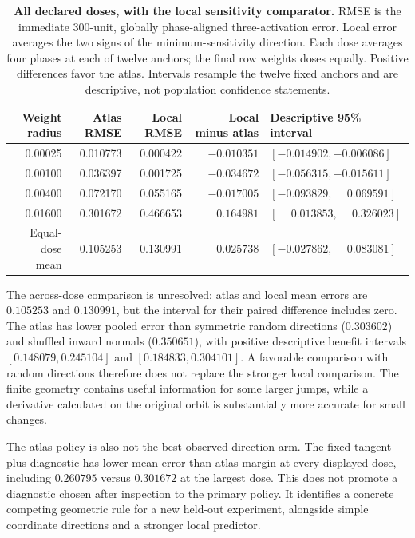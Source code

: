 \begin{table}[H]
\centering\small
\setlength{\tabcolsep}{4pt}
\begin{tabular}{rrrrl}
\toprule
Weight radius & Atlas RMSE & Local RMSE & Local minus atlas & Descriptive 95\% interval\\
\midrule
0.00025 & 0.010773 & 0.000422 & $-0.010351$ & $[-0.014902,-0.006086]$\\
0.00100 & 0.036397 & 0.001725 & $-0.034672$ & $[-0.056315,-0.015611]$\\
0.00400 & 0.072170 & 0.055165 & $-0.017005$ & $[-0.093829,\phantom{-}0.069591]$\\
0.01600 & 0.301672 & 0.466653 & $\phantom{-}0.164981$ & $[\phantom{-}0.013853,\phantom{-}0.326023]$\\
\midrule
Equal-dose mean & 0.105253 & 0.130991 & $\phantom{-}0.025738$ & $[-0.027862,\phantom{-}0.083081]$\\
\bottomrule
\end{tabular}
\caption{\textbf{All declared doses, with the local sensitivity comparator.} RMSE is the immediate 300-unit, globally phase-aligned three-activation error. Local error averages the two signs of the minimum-sensitivity direction. Each dose averages four phases at each of twelve anchors; the final row weights doses equally. Positive differences favor the atlas. Intervals resample the twelve fixed anchors and are descriptive, not population confidence statements.}
\label{tab:utility}
\end{table}

The across-dose comparison is unresolved: atlas and local mean errors are $0.105253$ and $0.130991$, but the interval for their paired difference includes zero. The atlas has lower pooled error than symmetric random directions ($0.303602$) and shuffled inward normals ($0.350651$), with positive descriptive benefit intervals $[0.148079,0.245104]$ and $[0.184833,0.304101]$. A favorable comparison with random directions therefore does not replace the stronger local comparison. The finite geometry contains useful information for some larger jumps, while a derivative calculated on the original orbit is substantially more accurate for small changes.

The atlas policy is also not the best observed direction arm. The fixed tangent-plus diagnostic has lower mean error than atlas margin at every displayed dose, including $0.260795$ versus $0.301672$ at the largest dose. This does not promote a diagnostic chosen after inspection to the primary policy. It identifies a concrete competing geometric rule for a new held-out experiment, alongside simple coordinate directions and a stronger local predictor.

